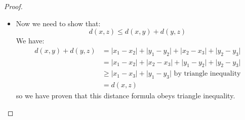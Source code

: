 \documentclass{article}
\begin{document}
\begin{proof}
\begin{itemize}
                \item Now we need to show that:
                    \begin{equation*}
                        d(x, z) \leq d(x, y) + d(y, z)
                    \end{equation*}
                We have:
                    \begin{align*}
                        d(x, y) + d(y, z) &= \lvert x_{1} - x_{2} \rvert + \lvert y_{1} - y_{2} \rvert + \lvert x_{2} - x_{3} \rvert + \lvert y_{2} - y_{3} \rvert \\
                                          &= \lvert x_{1} - x_{2} \rvert + \lvert x_{2} - x_{3} \rvert + \lvert y_{1} - y_{2} \rvert + \lvert y_{2} - y_{3} \rvert \\
                                          &\geq \lvert x_{1} - x_{3} \rvert + \lvert y_{1} - y_{3} \rvert \text{ by triangle inequality} \\
                                          &= d(x, z)
                    \end{align*}
                so we have proven that this distance formula obeys triangle inequality.
            \end{itemize}
    \end{proof}
\end{document}
